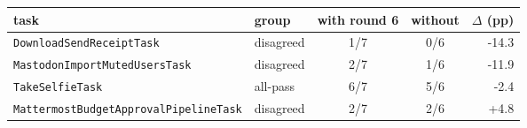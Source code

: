 \begin{tabular}{llccr}
\toprule
task & group & with round 6 & without & $\Delta$ (pp) \\
\midrule
\texttt{DownloadSendReceiptTask} & disagreed & 1/7 & 0/6 & -14.3 \\
\texttt{MastodonImportMutedUsersTask} & disagreed & 2/7 & 1/6 & -11.9 \\
\texttt{TakeSelfieTask} & all-pass & 6/7 & 5/6 & -2.4 \\
\texttt{MattermostBudgetApprovalPipelineTask} & disagreed & 2/7 & 2/6 & +4.8 \\
\bottomrule
\end{tabular}
